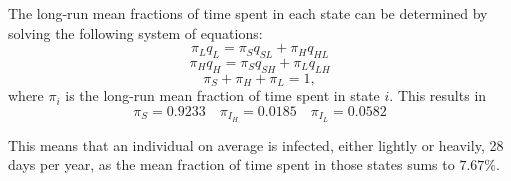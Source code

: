 The long-run mean fractions of time spent in each state can be determined by solving the following system of equations:
$$ \pi_L q_L = \pi_S q_{SL} + \pi_H q_{HL}$$
$$ \pi_H q_H = \pi_S q_{SH} + \pi_L q_{LH}$$
$$ \pi_S + \pi_H +\pi_L = 1, $$
where $\pi_i$ is the long-run mean fraction of time spent in state $i$. This results in 
$$\pi_S = 0.9233 \quad \pi_{I_H} = 0.0185 \quad \pi_{I_L} = 0.0582$$

This means that an individual on average is infected, either lightly or heavily, 28 days per year, as the mean fraction of time spent in those states sums to $7.67\%$.



